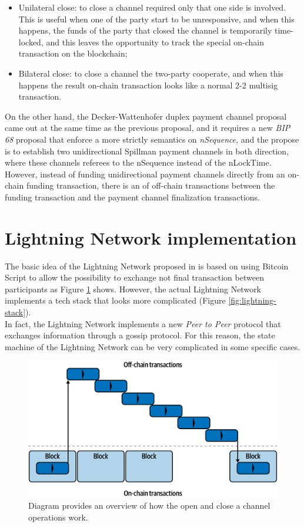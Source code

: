 \begin{itemize}
  \item Unilateral close: to close a channel required only that one side is involved. This is useful when one
        of the party start to be unresponsive, and when this happens, the funds of
        the party that closed the channel is temporarily time-locked, and this leaves the opportunity to
        track the special on-chain transaction on the blockchain;
  \item Bilateral close: to close a channel the two-party cooperate, and when this happens the result
        on-chain transaction looks like a normal 2-2 multisig transaction.
\end{itemize}

On the other hand, the Decker-Wattenhofer duplex payment channel proposal came out at the same time as the previous proposal, and
it requires a new \emph{BIP 68}\cite{bip68} proposal that enforce a more strictly semantics on \emph{nSequence}, and the propose is to
establish two unidirectional Spillman payment channels in both
direction, where these channels referees to the nSequence instead of the nLockTime.\\
However, instead of funding unidirectional payment channels directly from an on-chain funding transaction, there is an  of off-chain transactions between the funding transaction and the payment channel finalization transactions.

\section{Lightning Network implementation}

The basic idea of the Lightning Network proposed in \cite{lightning-network-paper} is based on using Bitcoin Script
to allow the possibility to exchange not final transaction between participants as Figure \ref{fig:ln-onchain} shows.
However, the actual Lightning Network implements a tech stack that looks more complicated (Figure \ref{fig:lightning-stack}).\\
In fact, the Lightning Network implements a new \emph{Peer to Peer} protocol that exchanges information through
a gossip protocol. For this reason, the state machine of the Lightning Network
can be very complicated in some specific cases.

\begin{figure}[h]
  \begin{center}
  \includegraphics[width=0.6\columnwidth]{imgs/mtln_0702.png}
  \end{center}
  \caption{Diagram provides an overview of how the open and close a channel operations work.}
  \label{fig:ln-onchain}
\end{figure}



